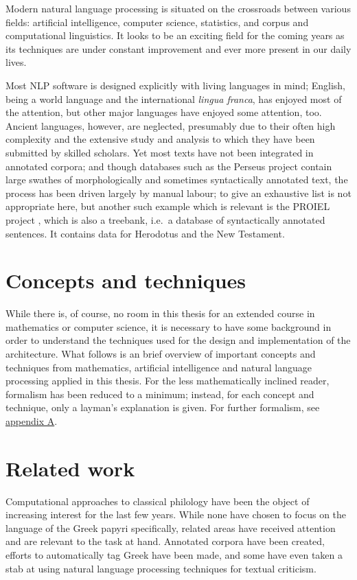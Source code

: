 Modern natural language processing is situated on the crossroads
between various fields: artificial intelligence, computer science,
statistics, and corpus and computational linguistics. It looks to be
an exciting field for the coming years as its techniques are under
constant improvement and ever more present in our daily lives.

Most NLP software is designed explicitly with living languages in
mind; English, being a world language and the international
\textit{lingua franca}, has enjoyed most of the attention, but other
major languages have enjoyed some attention, too. Ancient languages,
however, are neglected, presumably due to their often high complexity
and the extensive study and analysis to which they have been submitted
by skilled scholars. Yet most texts have not been integrated in
annotated corpora; and though databases such as the Perseus project
contain large swathes of morphologically and sometimes syntactically
annotated text, the process has been driven largely by manual labour;
to give an exhaustive list is not appropriate here, but another such
example which is relevant is the PROIEL project \citep{proiel}, which
is also a treebank, i.e.\ a database of syntactically annotated
sentences. It contains data for Herodotus and the New Testament.

\section{Concepts and techniques}
\label{sec:shortconcepts}
While there is, of course, no room in this thesis for an extended
course in mathematics or computer science, it is necessary to have
some background in order to understand the techniques used for the
design and implementation of the architecture. What follows is an
brief overview of important concepts and techniques from mathematics,
artificial intelligence and natural language processing applied in
this thesis. For the less mathematically inclined reader, formalism
has been reduced to a minimum; instead, for each concept and
technique, only a layman's explanation is given. For further
formalism, see \hyperref[chap:conceptstechniques]{appendix A}.

\section{Related work}
\label{sec:relatedwork}
Computational approaches to classical philology have been the object
of increasing interest for the last few years. While none have chosen
to focus on the language of the Greek papyri specifically, related
areas have received attention and are relevant to the task at
hand. Annotated corpora have been created, efforts to automatically
tag Greek have been made, and some have even taken a stab at using
natural language processing techniques for textual criticism. 

